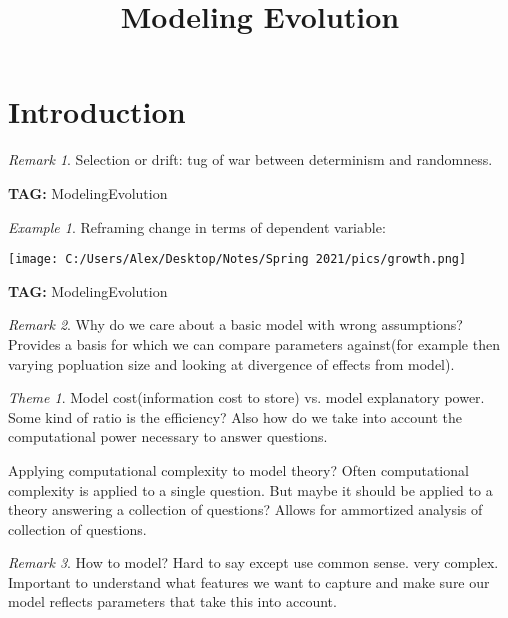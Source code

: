 \documentclass[11pt]{article}
\title{Modeling Evolution}
\theoremstyle{remark}
\newtheorem{remark}{Remark}
\newtheorem{theme}{Theme}
\newtheorem{example}{Example}
\begin{document}
\maketitle

\section{Introduction}

\begin{remark}
	Selection or drift: tug of war between determinism and randomness.
\end{remark}

\textbf{TAG:} ModelingEvolution

\begin{example}
	Reframing change in terms of dependent variable:
	
	\texttt{[image: C:/Users/Alex/Desktop/Notes/Spring 2021/pics/growth.png]}
\end{example}

\textbf{TAG:} ModelingEvolution

\begin{remark}
	Why do we care about a basic model with wrong assumptions? Provides a basis for which we can compare parameters against(for example then varying popluation size and looking at divergence of effects from model).
\end{remark}

\begin{theme}
	Model cost(information cost to store) vs. model explanatory power. Some kind of ratio is the efficiency? Also how do we take into account the computational power necessary to answer questions.

	Applying computational complexity to model theory? Often computational complexity is applied to a single question. But maybe it should be applied to a theory answering a collection of questions? Allows for ammortized analysis of collection of questions.
\end{theme}

\begin{remark}
	How to model? Hard to say except use common sense. very complex. Important to understand what features we want to capture and make sure our model reflects parameters that take this into account.
\end{remark}
\end{document}
